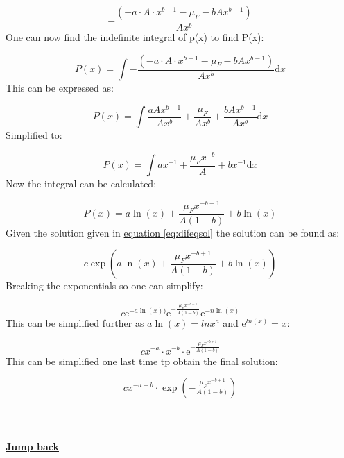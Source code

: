 \documentclass{article}
\numberwithin{equation}{section} %
\newcommand{\me}{\mathrm{e}}
\newcommand{\md}{\mathrm{d}}
\begin{document}
\begin{equation}
	-\dfrac{(-a\cdot A\cdot x^{b-1}-\mu_{F}-bAx^{b-1})}{Ax^b}
\end{equation}
One can now find the indefinite integral of p(x) to find P(x):

\begin{equation}
	P(x) = \int -\dfrac{(-a\cdot A\cdot x^{b-1}-\mu_{F}-bAx^{b-1})}{Ax^b}\md x
\end{equation}
This can be expressed as:

\begin{equation}
	P(x) = \int\dfrac{aAx^{b-1}}{Ax^b}+\dfrac{\mu_F}{Ax^b}+\dfrac{bAx^{b-1}}{Ax^b}\md x
\end{equation}
Simplified to:

\begin{equation}
	P(x) = \int ax^{-1}+\dfrac{\mu_Fx^{-b}}{A}+bx^{-1}\md x
\end{equation}
Now the integral can be calculated:

\begin{equation}
	P(x) = a\ln(x)+\dfrac{\mu_Fx^{-b+1}}{A(1-b)}+b\ln(x)
\end{equation}
Given the solution given in \hyperref[eq:difeqsol]{equation \ref{eq:difeqsol}} the solution can be found as:

\begin{equation}
    c\exp(a\ln(x)+\dfrac{\mu_Fx^{-b+1}}{A(1-b)}+b\ln(x))
\end{equation}
Breaking the exponentials so one can simplify:

\begin{equation}
	c\me^{-a\ln(x))}\me^{-\tfrac{\mu_Fx^{-b+1}}{A(1-b)}}\me^{-n\ln(x)}
\end{equation}
This can be simplified further as $a\ln(x)=ln{x^a}$ and $\me^{ln(x)}=x$:

\begin{equation}
    cx^{-a}\cdot x^{-b}\cdot\me^{-\tfrac{\mu_Fx^{-b+1}}{A(1-b)}}
\end{equation}
This can be simplified one last time tp obtain the final solution:

\begin{equation}
    cx^{-a-b}\cdot\exp\left(-\tfrac{\mu_Fx^{-b+1}}{A(1-b)}\right)
\end{equation}\\
\\
\\
\textbf{\hyperref[jmp:a:3extra1nx]{Jump back }}


\newpage
\end{document}
